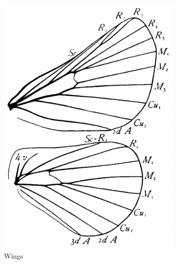 \documentclass[letterpaper, 11pt]{article}
\begin{document}
\begin{figure}[ht!]
    \centering
    \begin{subfigure}[ht!]{0.3\textwidth}
        \includegraphics[width=\textwidth]{LasiocampidWings}
        \caption{Wings \citep[Fig. 69]{comstock1918wings}}
        \label{fig:lasiocampid1}
    \end{subfigure}
    \qquad %
    \begin{subfigure}[ht!]{0.31\textwidth}

\end{subfigure}
\end{figure}
\end{document}
